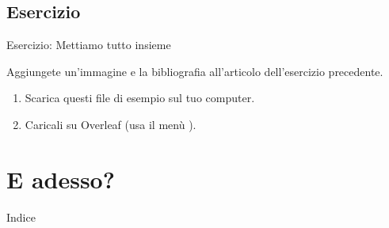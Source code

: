 \documentclass{beamer}
\begin{document}
\subsection{Esercizio}
\begin{frame}[fragile]{Esercizio: Mettiamo tutto insieme}

Aggiungete un'immagine e la bibliografia all'articolo dell'esercizio precedente.

\begin{enumerate}
\item Scarica questi file di esempio sul tuo computer.

\begin{center}

\end{center}

\item Caricali su Overleaf (usa il men\`u ).

\end{enumerate}
\end{frame}

\section{E adesso?}

\begin{frame}{Indice}
\begin{multicols}{2}
\tableofcontents[currentsection]
\end{multicols}
\end{frame}

\end{document}
